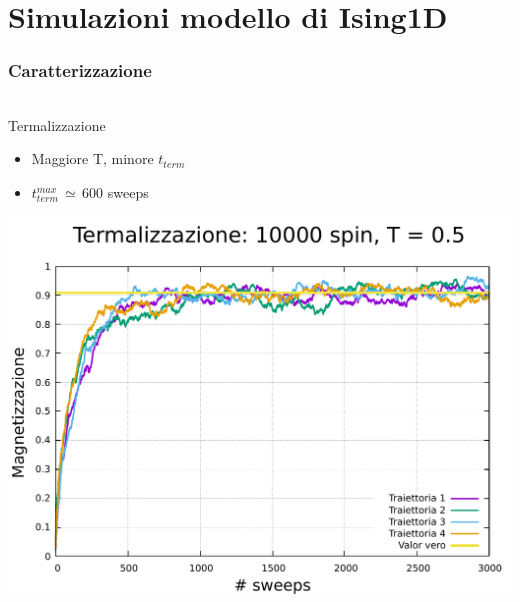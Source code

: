 \section{Simulazioni modello di Ising1D}

\begin{frame}
    \frametitle{Caratterizzazione}
    \framesubtitle{}

    \begin{columns}
        \begin{column}{0.33\textwidth}
            \begin{block}{Termalizzazione}

                \begin{itemize}[itemsep=0.5em, label=$\diamond$]
                    \item Maggiore T, minore $t_{term}$
                    \item $t_{term}^{max}\,\simeq\,600$ sweeps
                \end{itemize}

                \vspace{0.5cm}

                \centering
                \includegraphics[width=\textwidth]{Immagini/simIsing1D/term_10000_1.5.pdf}
            
            \end{block}
        \end{column}
    

\end{columns}
\end{frame}
